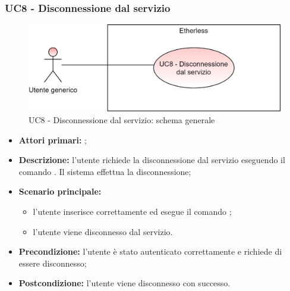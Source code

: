 \subsubsection{UC8 - Disconnessione dal servizio}
\begin{figure}[h]
	\centering
	\includegraphics[scale=\ucs]{./res/img/UC8G.png}
	\caption {UC8 - Disconnessione dal servizio: schema generale}
\end{figure}
\begin{itemize}
	\item \textbf{Attori primari:} \ua{};
	\item \textbf{Descrizione:} l’utente richiede la disconnessione dal servizio eseguendo il comando \logout{}. Il sistema effettua la disconnessione; 
	\item \textbf{Scenario principale:} 
	\begin{itemize}
		\item l'utente inserisce correttamente ed esegue il comando \logout{}; 
		\item l'utente viene disconnesso dal servizio. 
	\end{itemize}
	\item \textbf{Precondizione:} l’utente è stato autenticato correttamente e richiede di essere disconnesso; 
	\item \textbf{Postcondizione:} l’utente viene disconnesso con successo.
\end{itemize}
